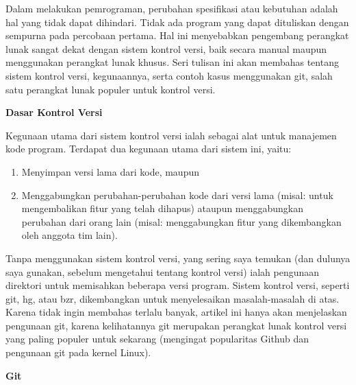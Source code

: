 Dalam melakukan pemrograman, perubahan spesifikasi atau kebutuhan adalah 
hal yang tidak dapat dihindari. Tidak ada program yang dapat dituliskan 
dengan sempurna pada percobaan pertama. Hal ini menyebabkan pengembang 
perangkat lunak sangat dekat dengan sistem kontrol versi, baik secara 
manual maupun menggunakan perangkat lunak khusus. Seri tulisan ini akan 
membahas tentang sistem kontrol versi, kegunaannya, serta contoh kasus 
menggunakan git, salah satu perangkat lunak populer untuk kontrol versi.
\vspace{12pt}

\textbf{Dasar Kontrol Versi}

Kegunaan utama dari sistem kontrol versi ialah sebagai alat untuk 
manajemen kode program. Terdapat dua kegunaan utama dari sistem ini, 
yaitu:

\begin{enumerate}
\item Menyimpan versi lama dari kode, maupun
\item Menggabungkan perubahan-perubahan kode dari versi lama (misal: 
untuk mengembalikan fitur yang telah dihapus) ataupun menggabungkan 
perubahan dari orang lain (misal: menggabungkan fitur yang dikembangkan 
oleh anggota tim lain).
\setcounter{numberedCntC}{\theenumi}
\end{enumerate}
Tanpa menggunakan sistem kontrol versi, yang sering saya temukan (dan 
dulunya saya gunakan, sebelum mengetahui tentang kontrol versi) ialah 
pengunaan direktori untuk memisahkan beberapa versi program.
\vspace{12pt}
Sistem kontrol versi, seperti git, hg, atau bzr, dikembangkan untuk 
menyelesaikan masalah-masalah di atas. Karena tidak ingin membahas 
terlalu banyak, artikel ini hanya akan menjelaskan pengunaan git, karena 
kelihatannya git merupakan perangkat lunak kontrol versi yang paling 
populer untuk sekarang (mengingat popularitas Github dan pengunaan git 
pada kernel Linux).
\vspace{12pt}


\textbf{Git}

